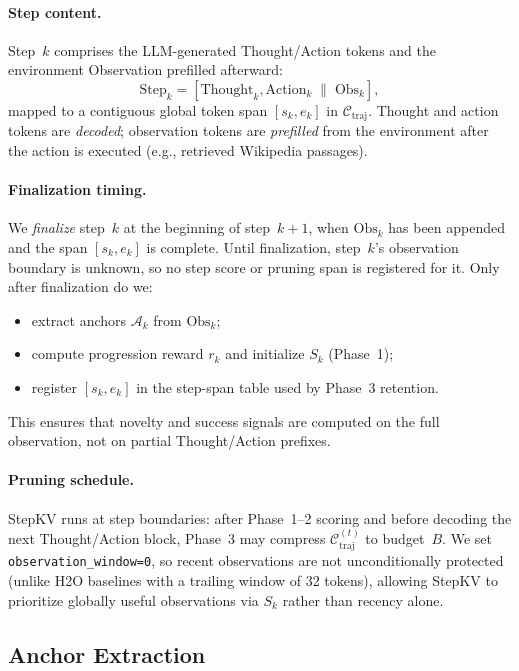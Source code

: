 \documentclass[11pt]{article}
\begin{document}
\paragraph{Step content.}
Step~$k$ comprises the LLM-generated Thought/Action tokens and the environment Observation prefilled afterward:
\begin{equation}
    \text{Step}_k = [\text{Thought}_k, \text{Action}_k \;\|\; \text{Obs}_k],
\end{equation}
mapped to a contiguous global token span $[s_k, e_k]$ in $\mathcal{C}_{\mathrm{traj}}$.
Thought and action tokens are \emph{decoded}; observation tokens are \emph{prefilled} from the environment after the action is executed (e.g., retrieved Wikipedia passages).

\paragraph{Finalization timing.}
We \emph{finalize} step~$k$ at the beginning of step~$k{+}1$, when $\text{Obs}_k$ has been appended and the span $[s_k,e_k]$ is complete.
Until finalization, step~$k$'s observation boundary is unknown, so no step score or pruning span is registered for it.
Only after finalization do we:
\begin{itemize}[leftmargin=*, nosep]
    \item extract anchors $\mathcal{A}_k$ from $\text{Obs}_k$;
    \item compute progression reward $r_k$ and initialize $S_k$ (Phase~1);
    \item register $[s_k,e_k]$ in the step-span table used by Phase~3 retention.
\end{itemize}
This ensures that novelty and success signals are computed on the full observation, not on partial Thought/Action prefixes.

\paragraph{Pruning schedule.}
StepKV runs at step boundaries: after Phase~1--2 scoring and before decoding the next Thought/Action block, Phase~3 may compress $\mathcal{C}_{\mathrm{traj}}^{(t)}$ to budget~$B$.
We set \texttt{observation\_window=0}, so recent observations are not unconditionally protected (unlike H2O baselines with a trailing window of 32 tokens), allowing StepKV to prioritize globally useful observations via $S_k$ rather than recency alone.

\subsection{Anchor Extraction}
\label{sec:anchor}
\end{document}
